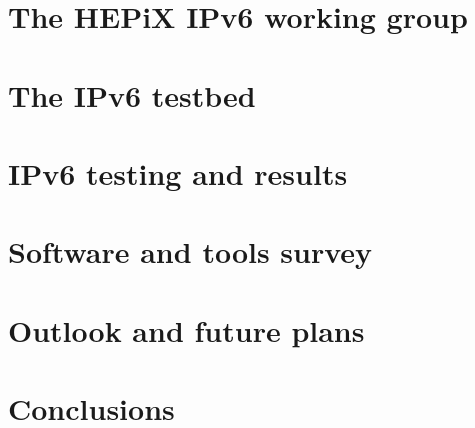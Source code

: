 \documentclass[a4paper]{jpconf}
\begin{document}
\section{The HEPiX IPv6 working group}


\section{The IPv6 testbed}


\section{IPv6 testing and results}


\section{Software and tools survey}


%

\section{Outlook and future plans}


\section{Conclusions}


\par

\end{document}
